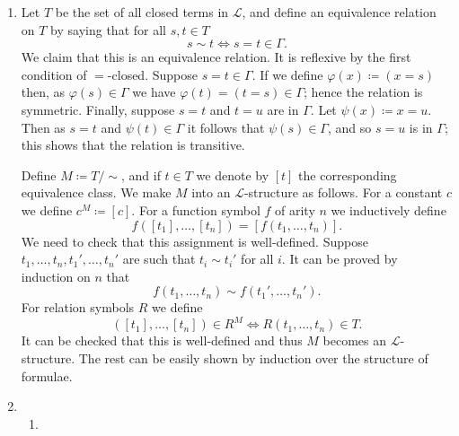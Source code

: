 \documentclass{article}
\theoremstyle{theorem}
\begin{document}
\begin{enumerate}[leftmargin=*]
		\item Let $T$ be the set of all closed terms in $\mathcal{L}$, and define an equivalence relation on $T$ by saying that for all $s,t\in T$
		\[
			s\sim t \iff s=t \in \Gamma.
		\]
		We claim that this is an equivalence relation. It is reflexive by the first condition of $=$-closed. Suppose $s=t\in \Gamma$. If we define $\varphi(x)\coloneqq (x=s)$ then, as $\varphi(s) \in \Gamma$ we have $\varphi(t) = (t=s)\in \Gamma$; hence the relation is symmetric. Finally, suppose $s=t$ and $t = u$ are in $\Gamma$. Let $\psi(x)\coloneqq x = u$. Then as $s = t$ and $\psi(t)\in \Gamma$ it follows that $\psi(s)\in \Gamma$, and so $s=u$ is in $\Gamma$; this shows that the relation is transitive.
		
		Define $M\coloneqq T/{\sim}$, and if $t\in T$ we denote by $[t]$ the corresponding equivalence class. We make $M$ into an $\mathcal{L}$-structure as follows. For a constant $c$ we define $c^M \coloneqq [c]$. For a function symbol $f$ of arity $n$ we inductively define
		\[	
			f([t_1],\ldots,[t_n]) = [f(t_1,\ldots,t_n)].
		\]
		We need to check that this assignment is well-defined. Suppose $t_1,\ldots,t_n,t_1',\ldots,t_n'$ are such that $t_i\sim t_i'$ for all $i$. It can be proved by induction on $n$ that 
		\[
			f(t_1,\ldots,t_n) \sim f(t_1',\ldots,t_n').
		\]	
		For relation symbols $R$ we define
		\[
			([t_1],\ldots,[t_n])\in R^M  \iff R(t_1,\ldots,t_n)\in T.
		\] 
		It can be checked that this is well-defined and thus $M$ becomes an $\mathcal{L}$-structure. The rest can be easily shown by induction over the structure of formulae.
		
		\item \leavevmode
		\begin{enumerate}
			\item 
		\end{enumerate}
		\end{enumerate}
\end{document}
